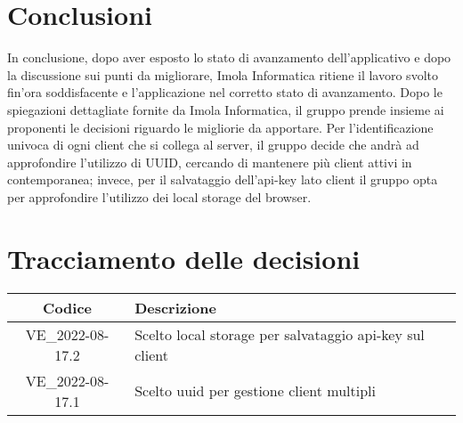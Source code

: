 \section{Conclusioni}
In conclusione, dopo aver esposto lo stato di avanzamento dell'applicativo e dopo la discussione sui punti da migliorare, Imola Informatica ritiene il lavoro svolto fin'ora soddisfacente e l'applicazione nel corretto stato di avanzamento. Dopo le spiegazioni dettagliate fornite da Imola Informatica, il gruppo prende insieme ai proponenti le decisioni riguardo le migliorie da apportare. Per l'identificazione univoca di ogni client che si collega al server, il gruppo decide che andrà ad approfondire l'utilizzo di UUID, cercando di mantenere più client attivi in contemporanea; invece, per il salvataggio dell'api-key lato client il gruppo opta per approfondire l'utilizzo dei local storage del browser. 
\newpage

\section*{Tracciamento delle decisioni}
	\renewcommand{\arraystretch}{1.8} %
	\begin{tabular}{ |c|l| }
		\hline
		\textbf{Codice} & \textbf{Descrizione} \\
		\hline
		VE\_2022-08-17.2 & Scelto local storage per salvataggio api-key sul client\\
		\hline
		VE\_2022-08-17.1 & Scelto uuid per gestione client multipli \\
		\hline
	\end{tabular}